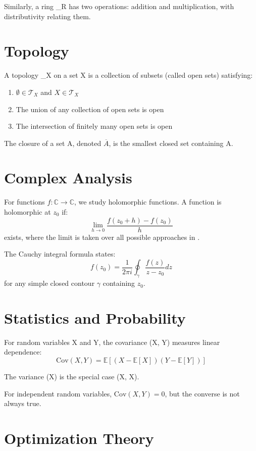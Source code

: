 \documentclass{article}
\newcommand{\complex}{\mathbb{C}}
\newcommand{\ring}[1]{\mathcal{R}_{#1}}
\newcommand{\topology}[1]{\mathcal{T}_{#1}}
\newcommand{\expectation}[1]{\mathbb{E}[#1]}
\newcommand{\variance}[1]{\text{Var}(#1)}
\newcommand{\covariance}[2]{\text{Cov}(#1, #2)}
\newcommand{\limit}[3]{\lim_{#1 \to #2} #3}
\begin{document}
Similarly, a ring \ring{R} has two operations: addition and multiplication, with distributivity relating them.

\section{Topology}

A topology \topology{X} on a set X is a collection of subsets (called open sets) satisfying:
\begin{enumerate}
\item \(\emptyset \in \topology{X}\) and \(X \in \topology{X}\)
\item The union of any collection of open sets is open
\item The intersection of finitely many open sets is open
\end{enumerate}

The closure of a set A, denoted \(\overline{A}\), is the smallest closed set containing A.

\section{Complex Analysis}

For functions \(f: \complex{} \to \complex{}\), we study holomorphic functions. A function is holomorphic at \(z_0\) if:
\[\limit{h}{0}{\frac{f(z_0 + h) - f(z_0)}{h}}\]
exists, where the limit is taken over all possible approaches in \complex{}.

The Cauchy integral formula states:
\[f(z_0) = \frac{1}{2\pi i} \oint_{\gamma} \frac{f(z)}{z - z_0} dz\]
for any simple closed contour \(\gamma\) containing \(z_0\).

\section{Statistics and Probability}

For random variables X and Y, the covariance \covariance{X}{Y} measures linear dependence:
\[\covariance{X}{Y} = \expectation{(X - \expectation{X})(Y - \expectation{Y})}\]

The variance \variance{X} is the special case \covariance{X}{X}.

For independent random variables, \(\covariance{X}{Y} = 0\), but the converse is not always true.

\section{Optimization Theory}
\end{document}
